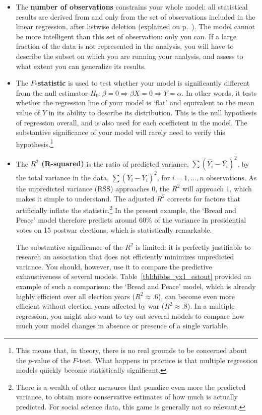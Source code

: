 	\begin{itemize}
		\item The \textbf{number of observations} constrains your whole model: all statistical results are derived from and only from the set of observations included in the linear regression, after listwise deletion (explained on p.~\pageref{casewise}). The model cannot be more intelligent than this set of observation: only you can. If a large fraction of the data is not represented in the analysis, you will have to describe the subset on which you are running your analysis, and assess to what extent you can generalize its results.

		\item The \textbf{$F$-statistic} is used to test whether your model is significantly different from the null estimator $H_0: \beta = 0 \Rightarrow \beta X = 0 \Rightarrow Y = \alpha$. In other words, it tests whether the regression line of your model is `flat' and equivalent to the mean value of $Y$ in its ability to describe its distribution. This is the null hypothesis of regression overall, and is also used for each coefficient in the model. The substantive significance of your model will rarely need to verify this hypothesis.\footnote{This means that, in theory, there is no real grounds to be concerned about the $p$-value of the $F$-test. What happens in practice is that multiple regression models quickly become statistically significant.}
		
		\item The \textbf{$R^2$ (R-squared)} is the ratio of predicted variance, $\sum{(\hat{Y_i}-\bar{Y_i})^2}$, by the total variance in the data, $\sum{(Y_i-\bar{Y_i})^2}$, for $i=1, \ldots, n$ observations. As the unpredicted variance (RSS) approaches 0, the $R^2$ will approach 1, which makes it simple to understand. The adjusted $R^2$ corrects for factors that artificially inflate the statistic.\footnote{There is a wealth of other measures that penalize even more the predicted variance, to obtain more conservative estimates of how much is actually predicted. For social science data, this game is generally not so relevant.} In the present example, the `Bread and Peace' model therefore predicts around 60\% of the variance in presidential votes on 15 postwar elections, which is statistically remarkable.
		
		The substantive significance of the $R^2$ is limited: it is perfectly justifiable to research an association that does not efficiently minimizes unpredicted variance. You should, however, use it to compare the predictive exhaustiveness of several models. Table~\ref{tbl:hibbs_yx1_estout} provided an example of such a comparison: the `Bread and Peace' model, which is already highly efficient over all election years ($R^2\approx.6$), can become even more efficient without election years affected by war ($R^2\approx.8$). In a multiple regression, you might also want to try out several models to compare how much your model changes in absence or presence of a single variable.


\end{itemize}
